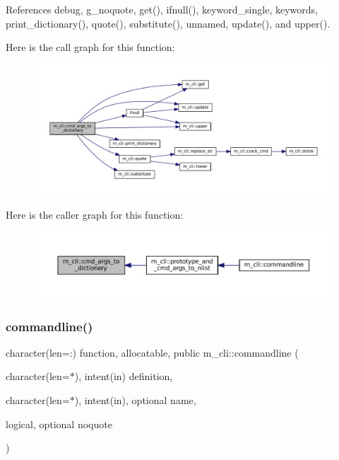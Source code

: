 References debug, g\+\_\+noquote, get(), ifnull(), keyword\+\_\+single, keywords, print\+\_\+dictionary(), quote(), substitute(), unnamed, update(), and upper().

Here is the call graph for this function\+:\nopagebreak
\begin{figure}[H]
\begin{center}
\leavevmode
\includegraphics[width=350pt]{namespacem__cli_a89a63254465b02048f09541e51974764_cgraph}
\end{center}
\end{figure}
Here is the caller graph for this function\+:\nopagebreak
\begin{figure}[H]
\begin{center}
\leavevmode
\includegraphics[width=350pt]{namespacem__cli_a89a63254465b02048f09541e51974764_icgraph}
\end{center}
\end{figure}
\mbox{\label{namespacem__cli_a4f639b0c4bf16930fc1c5858ed4196a3}} 
\subsubsection{\texorpdfstring{commandline()}{commandline()}}
{\footnotesize\ttfamily character(len=\+:) function, allocatable, public m\+\_\+cli\+::commandline (\begin{DoxyParamCaption}\item[{character(len=$\ast$), intent(in)}]{definition,  }\item[{character(len=$\ast$), intent(in), optional}]{name,  }\item[{logical, optional}]{noquote }\end{DoxyParamCaption})}




